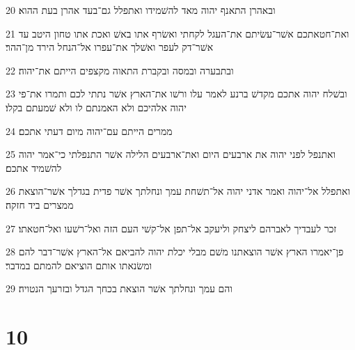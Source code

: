 \par 20 ובאהרן התאנף יהוה מאד להשׁמידו ואתפלל גם־בעד אהרן בעת ההוא׃
\par 21 ואת־חטאתכם אשׁר־עשׂיתם את־העגל לקחתי ואשׂרף אתו באשׁ ואכת אתו טחון היטב עד אשׁר־דק לעפר ואשׁלך את־עפרו אל־הנחל הירד מן־ההר׃
\par 22 ובתבערה ובמסה ובקברת התאוה מקצפים הייתם את־יהוה׃
\par 23 ובשׁלח יהוה אתכם מקדשׁ ברנע לאמר עלו ורשׁו את־הארץ אשׁר נתתי לכם ותמרו את־פי יהוה אלהיכם ולא האמנתם לו ולא שׁמעתם בקלו׃
\par 24 ממרים הייתם עם־יהוה מיום דעתי אתכם׃
\par 25 ואתנפל לפני יהוה את ארבעים היום ואת־ארבעים הלילה אשׁר התנפלתי כי־אמר יהוה להשׁמיד אתכם׃
\par 26 ואתפלל אל־יהוה ואמר אדני יהוה אל־תשׁחת עמך ונחלתך אשׁר פדית בגדלך אשׁר־הוצאת ממצרים ביד חזקה׃
\par 27 זכר לעבדיך לאברהם ליצחק וליעקב אל־תפן אל־קשׁי העם הזה ואל־רשׁעו ואל־חטאתו׃
\par 28 פן־יאמרו הארץ אשׁר הוצאתנו משׁם מבלי יכלת יהוה להביאם אל־הארץ אשׁר־דבר להם ומשׂנאתו אותם הוציאם להמתם במדבר׃
\par 29 והם עמך ונחלתך אשׁר הוצאת בכחך הגדל ובזרעך הנטויה׃

\chapter{10}

